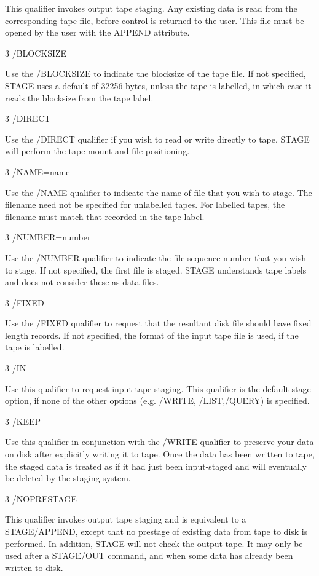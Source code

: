 \begin{XMP}
This qualifier invokes output tape staging. Any existing data
is read from the corresponding tape file, before control is
returned to the user. This file must be opened by the user
with the APPEND attribute.

3 /BLOCKSIZE

Use the /BLOCKSIZE to indicate the blocksize of the tape file.
If not specified, STAGE uses a default of 32256 bytes, unless the tape is
labelled, in which case it reads the blocksize from the tape label.

3 /DIRECT

Use the /DIRECT qualifier if you wish to read or write directly to tape.
STAGE will perform the tape mount and file positioning.

3 /NAME=name

Use the /NAME qualifier to indicate the name of file that you wish
to stage. The filename need not be specified for unlabelled tapes. For
labelled tapes, the filename must match that recorded in the tape label.

3 /NUMBER=number

Use the /NUMBER qualifier to indicate the file sequence number that
you wish to stage. If not specified, the first file is staged. STAGE
understands tape labels and does not consider these as data files.

3 /FIXED

Use the /FIXED qualifier to request that the resultant disk file should
have fixed length records. If not specified, the format of the input tape
file is used, if the tape is labelled.

3 /IN

Use this qualifier to request input tape staging. This qualifier is
the default stage option, if none of the other options (e.g. /WRITE,
 /LIST,/QUERY) is specified.

3 /KEEP

Use this qualifier in conjunction with the /WRITE qualifier to preserve
your data on disk after explicitly writing it to tape. Once the data
has been written to tape, the staged data is treated as if it had
just been input-staged and will eventually be deleted by the staging
system.

3 /NOPRESTAGE

This qualifier invokes output tape staging and is equivalent to a STAGE/APPEND,
except that no prestage of existing data from tape to disk is performed.
In  addition, STAGE will not check the output tape. It may only be
used after a STAGE/OUT command, and when some data has already
been written to disk.


\end{XMP}
